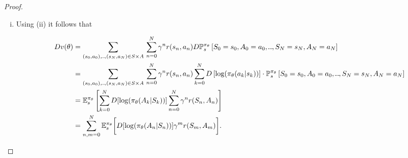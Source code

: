 \begin{proof}
\begin{enumerate}[(i)]
    \item Using (ii) it follows that 

    \begin{align*}
        Dv(\theta) &= \sum_{(s_{0},a_{0}),\kern-0.10em.\kern-0.06em.\kern-0.06em.\kern-0.1em,(s_N, a_N) \in S \times A}\, \sum_{ n = 0}^N \gamma^n r(s_n, a_n) D\mathbb{P}_s^{\pi_\theta} \left[ S_{0} = s_{0}, A_{0} = a_{0},\kern-0.10em.\kern-0.06em.\kern-0.06em.\kern-0.1em, S_N = s_N, A_N = a_N \right]\\
        &= \sum_{(s_{0},a_{0}),\kern-0.10em.\kern-0.06em.\kern-0.06em.\kern-0.1em,(s_N, a_N) \in S \times A}\, \sum_{ n = 0}^N \gamma^n r(s_n, a_n) \sum_{k=0}^N D \left[ \log(\pi_\theta(a_k|s_k)) \right]  \cdot \mathbb{P}_s^{\pi_\theta} \left[ S_{0} = s_{0}, A_{0} = a_{0},\kern-0.10em.\kern-0.06em.\kern-0.06em.\kern-0.1em, S_N = s_N, A_N = a_N \right]\\
        &= \mathbb{E}_s^{\pi_\theta} \left[ \sum_{k=0}^N D [\log(\pi_\theta(A_k | S_k))] \sum_{n=0}^N  \gamma^n r(S_n, A_n) \right]\\
        &= \sum_{n,m = 0}^N \mathbb{E}_s^{\pi_\theta}  \bigg[  D[\log(\pi_\theta(A_n | S_n))] \gamma^m r(S_m, A_m) \bigg].
    \end{align*}


\end{enumerate}
\end{proof}
